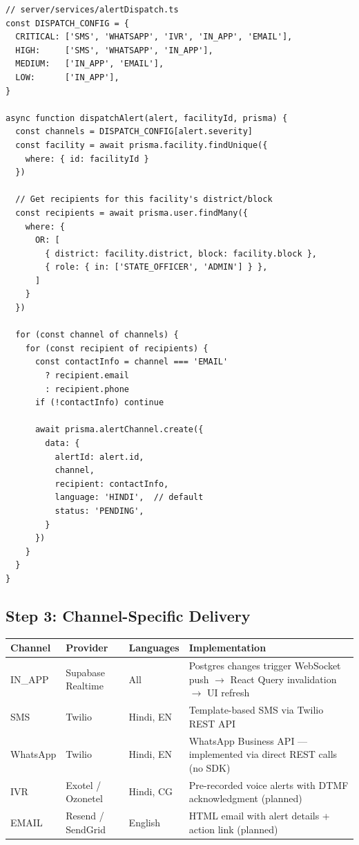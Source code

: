 \documentclass[12pt,a4paper]{report}
\begin{document}
\begin{lstlisting}[caption={Channel dispatch configuration}]
// server/services/alertDispatch.ts
const DISPATCH_CONFIG = {
  CRITICAL: ['SMS', 'WHATSAPP', 'IVR', 'IN_APP', 'EMAIL'],
  HIGH:     ['SMS', 'WHATSAPP', 'IN_APP'],
  MEDIUM:   ['IN_APP', 'EMAIL'],
  LOW:      ['IN_APP'],
}

async function dispatchAlert(alert, facilityId, prisma) {
  const channels = DISPATCH_CONFIG[alert.severity]
  const facility = await prisma.facility.findUnique({
    where: { id: facilityId }
  })

  // Get recipients for this facility's district/block
  const recipients = await prisma.user.findMany({
    where: {
      OR: [
        { district: facility.district, block: facility.block },
        { role: { in: ['STATE_OFFICER', 'ADMIN'] } },
      ]
    }
  })

  for (const channel of channels) {
    for (const recipient of recipients) {
      const contactInfo = channel === 'EMAIL'
        ? recipient.email
        : recipient.phone
      if (!contactInfo) continue

      await prisma.alertChannel.create({
        data: {
          alertId: alert.id,
          channel,
          recipient: contactInfo,
          language: 'HINDI',  // default
          status: 'PENDING',
        }
      })
    }
  }
}
\end{lstlisting}

\subsection{Step 3: Channel-Specific Delivery}

\begin{tabularx}{\textwidth}{lllX}
\toprule
\textbf{Channel} & \textbf{Provider} & \textbf{Languages} & \textbf{Implementation} \\
\midrule
IN\_APP   & Supabase Realtime & All       & Postgres changes trigger WebSocket push $\rightarrow$ React Query invalidation $\rightarrow$ UI refresh \\
SMS       & Twilio            & Hindi, EN & Template-based SMS via Twilio REST API \\
WhatsApp  & Twilio            & Hindi, EN & WhatsApp Business API --- implemented via direct REST calls (no SDK) \\
IVR       & Exotel / Ozonetel & Hindi, CG & Pre-recorded voice alerts with DTMF acknowledgment (planned) \\
EMAIL     & Resend / SendGrid & English   & HTML email with alert details + action link (planned) \\
\bottomrule
\end{tabularx}
\end{document}
